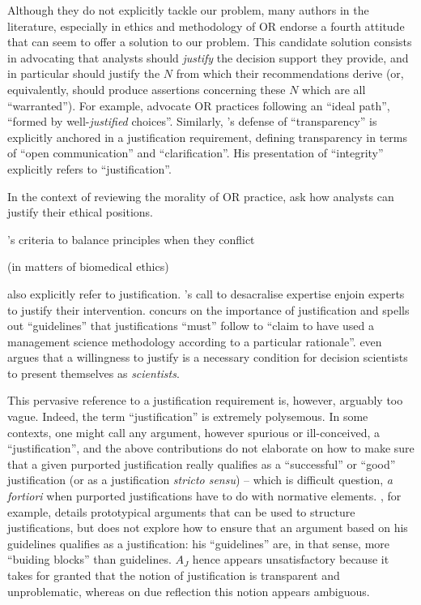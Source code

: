 \documentclass[preprint, french, english, 11pt, authoryear]{elsarticle}%
\newcommand{\possessivecite}[1]{\citeauthor{#1}’s \citeyearpar{#1}}
\begin{document}
Although they do not explicitly tackle our problem, many authors in the literature, especially in ethics and methodology of OR%
endorse a fourth attitude that can seem to offer a solution to our problem. This candidate solution consists in advocating that analysts should \emph{justify} the decision support they provide, and in particular should justify the $N$ from which their recommendations derive (or, equivalently, should produce assertions concerning these $N$ which are all ``warranted'').
For example, \citet{lahtinen_why_2017} advocate OR%
 practices following an ``ideal path'', ``formed by well-\emph{justified} choices''.
Similarly, \possessivecite{diekmann_moral_2013} defense of ``transparency'' is explicitly anchored in a justification requirement, defining transparency in terms of ``open communication'' and ``clarification''. His presentation of ``integrity'' explicitly refers to ``justification''.
\begin{changebar}In the context of reviewing the morality of OR practice, \citep{ormerod_operational_2013} ask how analysts can justify their ethical positions.\end{changebar}
 \possessivecite{beauchamp_principles_2009} criteria to balance principles when they conflict \begin{changebar}(in matters of biomedical ethics)\end{changebar} also explicitly refer to justification.
\possessivecite{white_death_1994} call to desacralise expertise enjoin experts to justify their intervention.
\citet{jackson_towards_1999} concurs on the importance of justification and spells out ``guidelines'' that justifications ``must'' follow to “claim to have used a management science methodology according to a particular rationale''.
\citet{ormerod_justifying_2010} even argues that a willingness to justify is a necessary condition for decision scientists to present themselves as \emph{scientists}.

 
This pervasive reference to a justification requirement is, however, arguably too vague. Indeed, the term ``justification'' is extremely polysemous. 
In some contexts, one might call any argument, however spurious or ill-conceived, a ``justification'', and the above contributions do not elaborate on how to make sure that a given purported justification really qualifies as a ``successful'' or ``good'' justification (or as a justification \emph{stricto sensu}) -- which is difficult question, \emph{a fortiori} when purported justifications have to do with normative elements.
\citet{jackson_towards_1999}, for example, details prototypical arguments that can be used to structure justifications, but does not explore how to ensure that an argument based on his guidelines qualifies as a justification: his ``guidelines'' are, in that sense, more ``buiding blocks'' than guidelines. 
$A_J$ hence appears unsatisfactory because it takes for granted that the notion of justification is transparent and unproblematic, whereas on due reflection this notion appears ambiguous.
\end{document}
